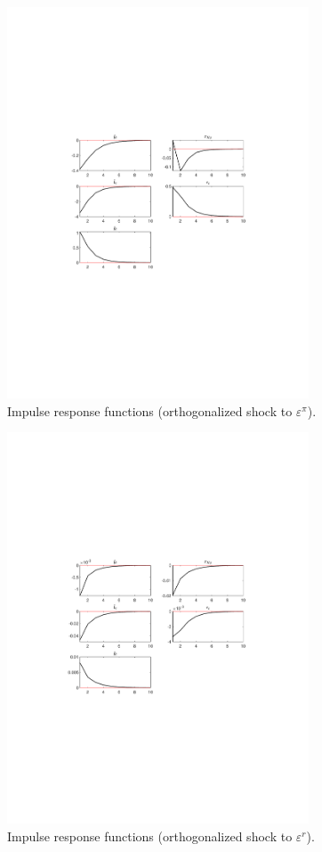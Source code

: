 \begin{figure}[H]
\centering 
\includegraphics[width=0.80\textwidth]{nash/graphs/nash_IRF_eps_pi}
\caption{Impulse response functions (orthogonalized shock to ${\varepsilon^{\pi}}$).}
\label{Fig:IRF:eps_pi}
\end{figure}
 
\begin{figure}[H]
\centering 
\includegraphics[width=0.80\textwidth]{nash/graphs/nash_IRF_eps_r}
\caption{Impulse response functions (orthogonalized shock to ${\varepsilon^{r}}$).}
\label{Fig:IRF:eps_r}
\end{figure}
 
